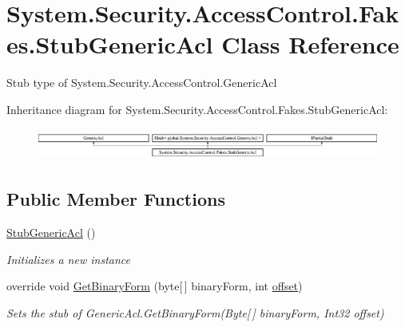 \hypertarget{class_system_1_1_security_1_1_access_control_1_1_fakes_1_1_stub_generic_acl}{\section{System.\-Security.\-Access\-Control.\-Fakes.\-Stub\-Generic\-Acl Class Reference}
\label{class_system_1_1_security_1_1_access_control_1_1_fakes_1_1_stub_generic_acl}
}


Stub type of System.\-Security.\-Access\-Control.\-Generic\-Acl 


Inheritance diagram for System.\-Security.\-Access\-Control.\-Fakes.\-Stub\-Generic\-Acl\-:\begin{figure}[H]
\begin{center}
\leavevmode
\includegraphics[height=1.048689cm]{class_system_1_1_security_1_1_access_control_1_1_fakes_1_1_stub_generic_acl}
\end{center}
\end{figure}
\subsection*{Public Member Functions}
\begin{DoxyCompactItemize}
\item 
\hyperlink{class_system_1_1_security_1_1_access_control_1_1_fakes_1_1_stub_generic_acl_a0aafe5f45f322eaf0face5476f22a660}{Stub\-Generic\-Acl} ()
\begin{DoxyCompactList}\small\item\em Initializes a new instance\end{DoxyCompactList}\item 
override void \hyperlink{class_system_1_1_security_1_1_access_control_1_1_fakes_1_1_stub_generic_acl_af1d2410c9238f3b31632451f4b47bff9}{Get\-Binary\-Form} (byte\mbox{[}$\,$\mbox{]} binary\-Form, int \hyperlink{jquery-1_810_82_8js_a4a9f594d20d927164551fc7fa4751a2f}{offset})
\begin{DoxyCompactList}\small\item\em Sets the stub of Generic\-Acl.\-Get\-Binary\-Form(\-Byte\mbox{[}$\,$\mbox{]} binary\-Form, Int32 offset)\end{DoxyCompactList}\end{DoxyCompactItemize}
